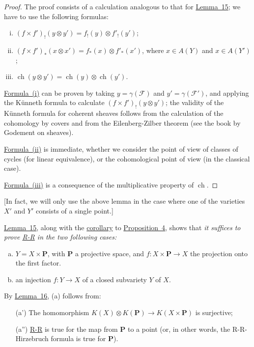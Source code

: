 \documentclass{article}
\theoremstyle{plain}
\theoremstyle{definition}
\newcommand{\scr}[1]{{\mathscr{#1}}}
\newcommand{\PP}{\mathbf{P}}
\DeclareMathOperator{\ch}{ch}
\newcommand{\oldpage}[1]{\marginpar{\footnotesize$\Big\vert$ \textit{p.~#1}}}
\begin{document}
\begin{proof}
  The proof consists of a calculation analogous to that for \hyperref[lemma15]{Lemma~15};
  we have to use the following formulas:
  \begin{enumerate}[(i)]
    \item $(f\times f')_!(y\otimes y') = f_!(y)\otimes f'_!(y')$;
      \label{lemma16equation1}
    \item $(f\times f')_*(x\otimes x') = f_*(x)\otimes f'_*(x')$, where $x\in A(Y)$ and $x\in A(Y')$;
      \label{lemma16equation2}
    \item $\ch(y\otimes y') = \ch(y)\otimes\ch(y')$.
      \label{lemma16equation3}
  \end{enumerate}

  \hyperref[lemma16equation1]{Formula~(i)} can be proven by taking $y=\gamma(\scr{F})$ and $y'=\gamma(\scr{F}')$, and applying the K\"{u}nneth formula to calculate $(f\times f')_!(y\otimes y')$;
  the validity of the K\"{u}nneth formula for coherent sheaves follows from the calculation of the cohomology by covers and from the Eilenberg-Zilber theorem (see the book by Godement on sheaves).

  \hyperref[lemma16equation2]{Formula~(ii)} is immediate, whether we consider the point of view of classes of cycles (for linear equivalence), or the cohomological point of view (in the classical case).

  \oldpage{115}
  \hyperref[lemma16equation3]{Formula~(iii)} is a consequence of the multiplicative property of $\ch$.
\end{proof}

[In fact, we will only use the above lemma in the case where one of the varieties $X'$ and $Y'$ consists of a single point.]

\hyperref[lemma15]{Lemma~15}, along with the \hyperref[corollary5]{corollary} to \hyperref[proposition4]{Proposition~4}, shows that \emph{it suffices to prove \hyperref[theoremriemannroch]{R-R} in the two following cases:}
\begin{enumerate}[(a)]
  \item $Y=X\times\PP$, with $\PP$ a projective space, and $f\colon X\times\PP\to X$ the projection onto the first factor.
  \item an injection $f\colon Y\to X$ of a closed subvariety $Y$ of $X$.
\end{enumerate}

By \hyperref[lemma16]{Lemma~16}, (a) follows from:
\begin{enumerate}
  \item[\rm{(a')}] The homomorphism $K(X)\otimes K(\PP)\to K(X\times\PP)$ is surjective;
  \item[\rm{(a'')}] \hyperref[theoremriemannroch]{R-R} is true for the map from $\PP$ to a point (or, in other words, the R-R-Hirzebruch formula is true for $\PP$).
\end{enumerate}
\end{document}
